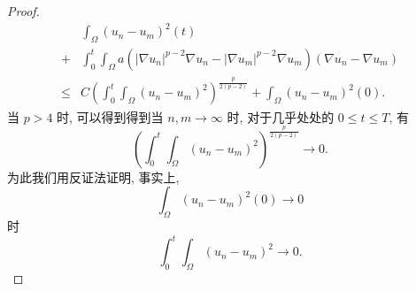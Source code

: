 \documentclass[oneside,longtitle]{LZUthesis}
\numberwithin{equation}{chapter}
\newcommand*\abs[1]{\lvert#1\rvert}
\begin{document}
\begin{proof}
\begin{equation}
\begin{split}
			& \int_{\Omega}\left(u_n-u_m\right)^2(t)\\
			+{} & \int_{0}^{t}\int_{\Omega}a
			\left(\abs{\nabla u_n}^{p-2}\nabla u_n
			- \abs{\nabla u_m}^{p-2}\nabla u_m\right)
			\left(\nabla u_n - \nabla u_m\right)\\
			\leq{} & C\left(\int_0^t\int_{\Omega}
			\left(u_n-u_m\right)^2\right)^{\frac{p}{2(p-2)}}
			+ \int_{\Omega}\left(u_n-u_m\right)^2(0).
		\end{split}
	\end{equation}
	当 $p>4$ 时,
	可以得到得到当 $n, m \to \infty$ 时,
	对于几乎处处的 $0 \leq t \leq T$, 有
	\begin{equation*}
		\left(\int_0^t\int_{\Omega}
			\left(u_n-u_m\right)^2\right)^{\frac{p}{2(p-2)}} \to 0.
	\end{equation*}
	为此我们用反证法证明, 事实上,
	\begin{equation*}
		\int_{\Omega}\left(u_n-u_m\right)^2(0) \to 0
	\end{equation*}
	时
	\begin{equation*}
		\int_0^t\int_{\Omega}\left(u_n-u_m\right)^2 \to 0.
	\end{equation*}


\end{proof}
\end{document}
